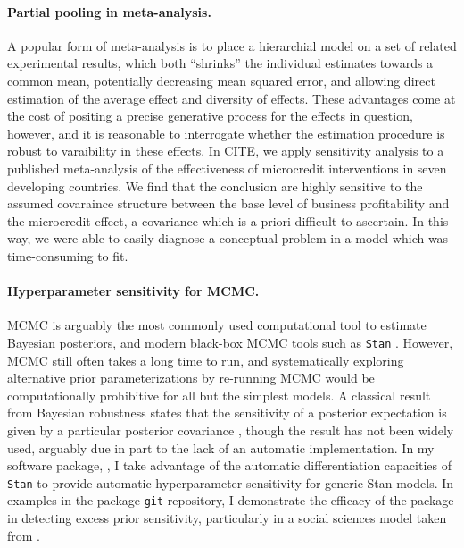 \paragraph{Partial pooling in meta-analysis.}

A popular form of meta-analysis is to place a hierarchial model on a set of
related experimental results, which both ``shrinks'' the individual estimates
towards a common mean, potentially decreasing mean squared error, and
allowing direct estimation of the average effect and diversity of effects.
These advantages come at the cost of positing a precise generative
process for the effects in question, however, and it is reasonable to
interrogate whether the estimation procedure is robust to varaibility
in these effects.  In CITE, we apply sensitivity analysis to a published
meta-analysis of the effectiveness of microcredit interventions in seven
developing countries.  We find that the conclusion are highly sensitive
to the assumed covaraince structure between the base level of business
profitability and the microcredit effect, a covariance which is a priori
difficult to ascertain.  In this way, we were able to easily diagnose
a conceptual problem in a model which was time-consuming to fit.



\paragraph{Hyperparameter sensitivity for MCMC.}

MCMC is arguably the most commonly used computational tool to estimate Bayesian
posteriors, and modern black-box MCMC tools such as \texttt{Stan} \citep{rstan,
carpenter:2017:stan}.  However, MCMC still often takes a long time to run, and
systematically exploring alternative prior parameterizations by re-running MCMC
would be computationally prohibitive for all but the simplest models. A
classical result from Bayesian robustness states that the sensitivity of a
posterior expectation is given by a particular posterior covariance
\citep{gustafson:1996:localposterior, basu:1996:local}, though the result has
not been widely used, arguably due in part to the lack of an automatic
implementation. In my software package, \citet{giordano:2020:rstansensitivity},
I take advantage of the automatic differentiation capacities of
\texttt{Stan} to provide automatic hyperparameter sensitivity for
generic Stan models.  In examples in the package \texttt{git} repository,
I demonstrate the efficacy of the package in detecting excess prior
sensitivity, particularly in a social sciences model taken from
\citet[Chapter 13.5]{gelman:2006:arm}.


